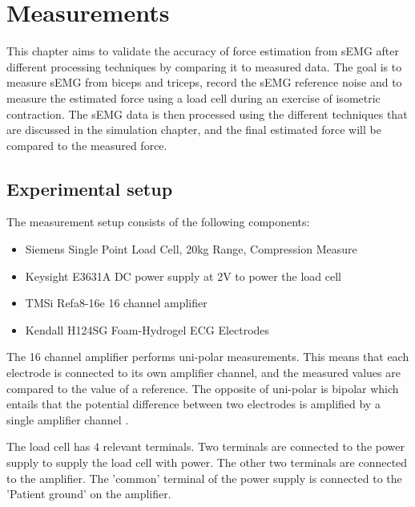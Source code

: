 \chapter{Measurements}\label{sec:measurements}
This chapter aims to validate the accuracy of force estimation from sEMG after different processing techniques by comparing it to measured data. The goal is to measure sEMG from biceps and triceps,  record the sEMG reference noise and to measure the estimated force using a load cell during an exercise of isometric contraction. The sEMG data is then processed using the different techniques that are discussed in the simulation chapter, and the final estimated force will be compared to the measured force. 

\section{Experimental setup}
The measurement setup consists of the following components:
\begin{itemize}
    \item Siemens Single Point Load Cell, 20kg Range, Compression Measure
    \item Keysight E3631A DC power supply at 2V to power the load cell
    \item TMSi Refa8-16e 16 channel amplifier
    \item Kendall H124SG Foam-Hydrogel ECG Electrodes 
\end{itemize}

The 16 channel amplifier performs uni-polar measurements. This means that each electrode is connected to its own amplifier channel, and the measured values are compared to the value of a reference. The opposite of uni-polar is bipolar which entails that the potential difference between two electrodes is amplified by a single amplifier channel \cite{tmsi_unipolar_bipolar}. 

The load cell has 4 relevant terminals. Two terminals are connected to the power supply to supply the load cell with power. The other two terminals are connected to the amplifier. The 'common' terminal of the power supply is connected to the 'Patient ground' on the amplifier.


